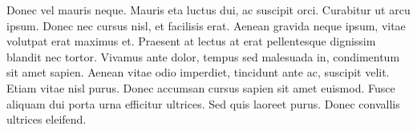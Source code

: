 \documentclass[DoubleHeader, Abgabe]{../abgaben}
\begin{document}
		
	\blinditemize
	
	Donec vel mauris neque. Mauris eta luctus dui, ac suscipit orci. Curabitur ut arcu ipsum. Donec nec cursus nisl, et facilisis erat. Aenean gravida neque ipsum, vitae volutpat erat maximus et. Praesent at lectus at erat pellentesque dignissim blandit nec tortor. Vivamus ante dolor, tempus sed malesuada in, condimentum sit amet sapien. Aenean vitae odio imperdiet, tincidunt ante ac, suscipit velit. Etiam vitae nisl purus. Donec accumsan cursus sapien sit amet euismod. Fusce aliquam dui porta urna efficitur ultrices. Sed quis laoreet purus. Donec convallis ultrices eleifend. 	
	\begin{solution}
		
	\end{solution}
\end{document}
